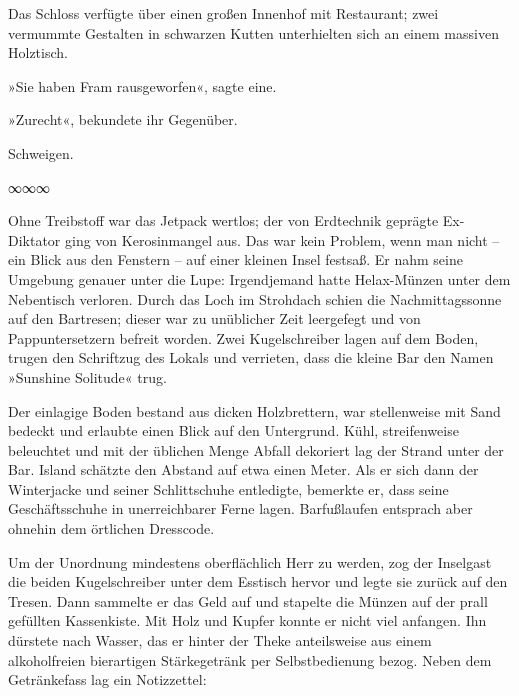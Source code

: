 Das Schloss verfügte über einen großen Innenhof mit Restaurant; zwei vermummte Gestalten in schwarzen Kutten unterhielten sich an einem massiven Holztisch.

»Sie haben Fram rausgeworfen«, sagte eine.

»Zurecht«, bekundete ihr Gegenüber.

Schweigen.

\begin{center}
	∞∞∞
\end{center}

Ohne Treibstoff war das Jetpack wertlos; der von Erdtechnik geprägte Ex-Diktator ging von Kerosinmangel aus. Das war kein Problem, wenn man nicht – ein Blick aus den Fenstern – auf einer kleinen Insel festsaß. Er nahm seine Umgebung genauer unter die Lupe: Irgendjemand hatte Helax-Münzen unter dem Nebentisch verloren. Durch das Loch im Strohdach schien die Nachmittagssonne auf den Bartresen; dieser war zu unüblicher Zeit leergefegt und von Pappuntersetzern befreit worden. Zwei Kugelschreiber lagen auf dem Boden, trugen den Schriftzug des Lokals und verrieten, dass die kleine Bar den Namen »Sunshine Solitude« trug.

Der einlagige Boden bestand aus dicken Holzbrettern, war stellenweise mit Sand bedeckt und erlaubte einen Blick auf den Untergrund. Kühl, streifenweise beleuchtet und mit der üblichen Menge Abfall dekoriert lag der Strand unter der Bar. Island schätzte den Abstand auf etwa einen Meter. Als er sich dann der Winterjacke und seiner Schlittschuhe entledigte, bemerkte er, dass seine Geschäftsschuhe in unerreichbarer Ferne lagen. Barfußlaufen entsprach aber ohnehin dem örtlichen Dresscode.

Um der Unordnung mindestens oberflächlich Herr zu werden, zog der Inselgast die beiden Kugelschreiber unter dem Esstisch hervor und legte sie zurück auf den Tresen. Dann sammelte er das Geld auf und stapelte die Münzen auf der prall gefüllten Kassenkiste. Mit Holz und Kupfer konnte er nicht viel anfangen. Ihn dürstete nach Wasser, das er hinter der Theke anteilsweise aus einem alkoholfreien bierartigen Stärkegetränk per Selbstbedienung bezog. Neben dem Getränkefass lag ein Notizzettel:

